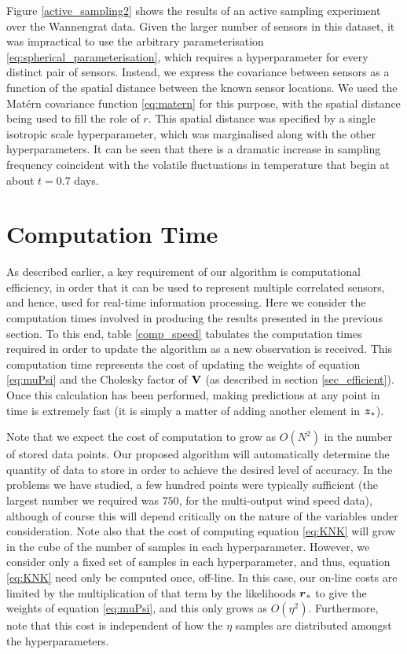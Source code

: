 \documentclass{acmtrans2m}
\begin{document}
Figure \ref{active_sampling2} shows the results of an active sampling experiment over the Wannengrat data. Given the larger number of sensors in this dataset, it was impractical to use the arbitrary parameterisation  \eqref{eq:spherical_parameterisation}, which requires a hyperparameter for every distinct pair of sensors. Instead, we express the covariance between sensors as a function of the spatial distance between the known sensor locations. We used the Mat\'{e}rn covariance function \eqref{eq:matern} for this purpose, with the spatial distance being used to fill the role of $r$. This spatial distance was specified by a single isotropic scale hyperparameter, which was marginalised along with the other hyperparameters. It can be seen that there is a dramatic increase in sampling frequency coincident with the volatile fluctuations in temperature that begin at about $t=0.7$ days.

\section{Computation Time}\label{sec_computation}

\noindent As described earlier, a key requirement of our algorithm is computational efficiency, in order that it can be used to represent multiple correlated sensors, and hence, used for real-time information processing. Here we consider the computation times involved in producing the results presented in the previous section. To this end, table \ref{comp_speed} tabulates the computation times required in order to update the algorithm as a new observation is received. This computation time represents the cost of updating the weights of equation \eqref{eq:muPsi} and the Cholesky factor of $\mathbf{V}$ (as described in section \ref{sec_efficient}). Once this calculation has been performed, making predictions at any point in time is extremely fast (it is simply a matter of adding another element in $\boldsymbol{z}_\star$).

Note that we expect the cost of computation to grow as $O(N^2)$ in the number of stored data points. Our proposed algorithm will automatically determine the quantity of data to store in order to achieve the desired level of accuracy. In the problems we have studied, a few hundred points were typically sufficient (the largest number we required was $750$, for the multi-output wind speed data), although of course this will depend critically on the nature of the variables under consideration. Note also that the cost of computing equation \eqref{eq:KNK} will grow in the cube of the number of samples in each hyperparameter. However, we consider only a fixed set of samples in each hyperparameter, and thus, equation \eqref{eq:KNK} need only be computed once, off-line. In this case, our on-line costs are limited by the multiplication of that term by the likelihoods $\boldsymbol{r}_s$ to give the weights of equation \eqref{eq:muPsi}, and this only grows as $O(\eta^2)$. Furthermore, note that this cost is independent of how the $\eta$ samples are distributed amongst the hyperparameters.
\end{document}
